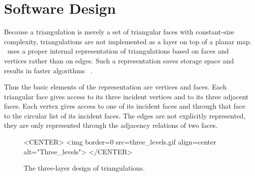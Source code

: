 \section{Software Design}
\label{Section_2D_Triangulations_Software_Design}

Because a triangulation is merely a set of
triangular faces with constant-size complexity,
triangulations are not implemented
as a layer on top of a planar map.
\cgal\ uses a proper internal
representation of triangulations based on faces and vertices
rather than on edges. Such a  representation
saves storage space and results in faster
algorithms~ \cite{bdty-tc-00}.

Thus the basic elements of the representation are vertices and faces.
Each triangular face gives access to its three incident vertices 
and to its three adjacent faces. 
Each vertex gives access to one of its incident faces
and through that face to the circular list of its incident faces.
The edges are not explicitly represented, they are only represented 
through the adjacency relations of two faces.

\begin{figure}
\begin{ccTexOnly}
\begin{center}

\end{center}
\end{ccTexOnly}
\caption{The three-layer design of triangulations.
\label{I1_Fig_three_levels}}
\begin{ccHtmlOnly}
<CENTER>
<img border=0 src=three_levels.gif align=center alt="Three_levels">
</CENTER>
\end{ccHtmlOnly}
\end{figure}


